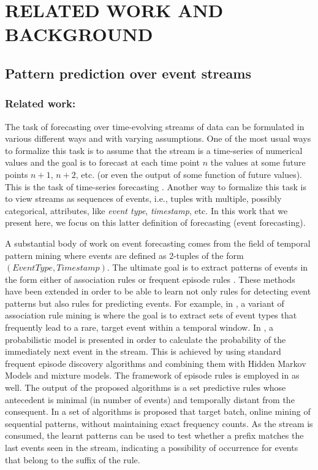 \section{RELATED WORK AND BACKGROUND}

\subsection{Pattern prediction over event streams}


\subsubsection*{Related work:\\}
The task of forecasting over time-evolving streams of data can be formulated in various different ways and with varying assumptions.
One of the most usual ways to formalize this task is to assume that the stream is a time-series of numerical values and the goal is to forecast at each time point $n$ the values at some future points $n+1$, $n+2$, etc. (or even the output of some function of future values). 
This is the task of time-series forecasting \cite{montgomery_introduction_2015}.
Another way to formalize this task is to view streams as sequences of events,
i.e., tuples with multiple, possibly categorical, attributes, like \textit{event type}, \textit{timestamp}, etc. 
In this work that we present here, 
we focus on this latter definition of forecasting (event forecasting).  

A substantial body of work on event forecasting comes from the field of temporal pattern mining where events are defined as 2-tuples of the form $(\mathit{EventType},\mathit{Timestamp})$.
The ultimate goal is to extract patterns of events in the form either of association rules \cite{agrawal_mining_1993} or frequent episode rules \cite{mannila_discovery_1997}. 
These methods have been extended in order to be able to learn not only rules for detecting event patterns but also rules for predicting events.
For example, in \cite{vilalta_predicting_2002}, a variant of association rule mining is where the goal is to extract sets of event types that frequently lead to a rare, target event within a temporal window. 
In \cite{laxman_stream_2008}, a probabilistic model is presented
in order to calculate the probability of the immediately next event in the stream. 
This is achieved by using standard frequent episode discovery algorithms and combining them with Hidden Markov Models and mixture models.
The framework of episode rules is employed in \cite{fahed_efficient_2014} as well.
The output of the proposed algorithms is a set predictive rules whose antecedent is minimal (in number of events) and temporally distant from the consequent.
In \cite{zhou_pattern_2015} a set of algorithms is proposed that target batch, online mining of sequential patterns, without maintaining exact frequency counts.
As the stream is consumed, the learnt patterns can be used to test whether a prefix matches the last events seen in the stream, 
indicating a possibility of occurrence for events that belong to the suffix of the rule.

